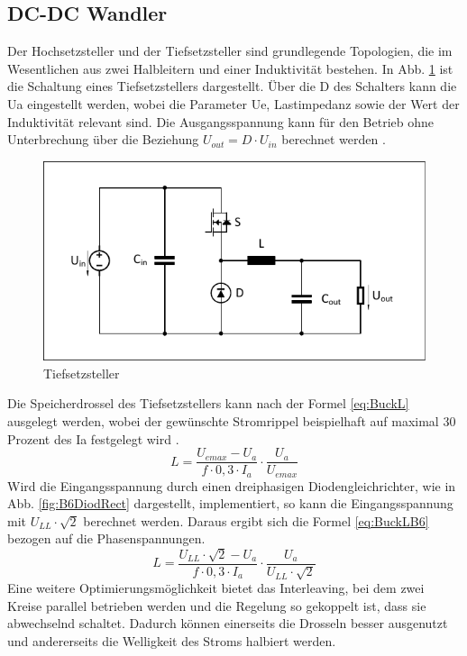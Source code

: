 		\subsection{DC-DC Wandler} \label{sec:Buck}
		Der Hochsetzsteller und der Tiefsetzsteller sind grundlegende Topologien, die im Wesentlichen aus zwei Halbleitern und einer Induktivität bestehen. In Abb. \ref{fig:buck} ist die Schaltung eines Tiefsetzstellers dargestellt. Über die \gls{D} des Schalters kann die \gls{Ua} eingestellt werden, wobei die Parameter \gls{Ue}, Lastimpedanz sowie der Wert der Induktivität relevant sind. Die Ausgangsspannung kann für den Betrieb ohne Unterbrechung über die Beziehung $U_{out}=D\cdot U_{in} $ berechnet werden \cite{schmidtwalter}.\\
		\begin{figure}
			\centering
			\includegraphics[width=0.7\linewidth]{content/Grafiken/Buck}
			\caption[Tiefsetzsteller]{Tiefsetzsteller}
			\label{fig:buck}
		\end{figure}
		Die Speicherdrossel des Tiefsetzstellers kann nach der Formel \ref{eq:BuckL} ausgelegt werden, wobei der gewünschte Stromrippel beispielhaft auf maximal 30 Prozent des \gls{Ia} festgelegt wird \cite{schmidtwalter}.
		\begin{equation}
			\label{eq:BuckL}
			L=\dfrac{U_{emax}-U_{a}}{f\cdot 0,3 \cdot I_{a}}\cdot \dfrac{U_{a}}{U_{emax}}
		\end{equation}
		Wird die Eingangsspannung durch einen dreiphasigen Diodengleichrichter, wie in Abb. \ref{fig:B6DiodRect} dargestellt,  implementiert, so kann die Eingangsspannung mit $U_{LL} \cdot \sqrt{2}$ berechnet werden. Daraus ergibt sich die Formel \ref{eq:BuckLB6} bezogen auf die Phasenspannungen. \\
		\begin{equation}
			\label{eq:BuckLB6}
			L=\dfrac{U_{LL} \cdot \sqrt{2}-U_{a}}{f\cdot 0,3 \cdot I_{a}}\cdot \dfrac{U_{a}}{U_{LL} \cdot \sqrt{2}}
		\end{equation}
		Eine weitere Optimierungsmöglichkeit bietet das Interleaving, bei dem zwei Kreise parallel betrieben werden und die Regelung so gekoppelt ist, dass sie abwechselnd schaltet. Dadurch können einerseits die Drosseln besser ausgenutzt und andererseits die Welligkeit des Stroms halbiert werden. 
		
